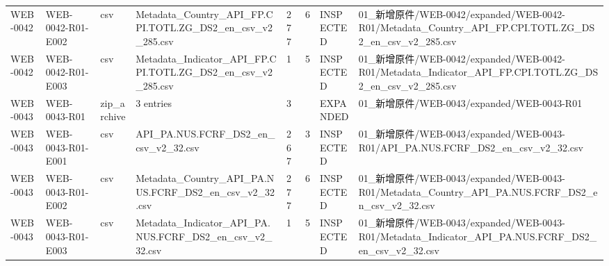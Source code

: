 \begin{landscape}
\begin{longtable}{p{1.8cm}p{2.2cm}p{3.1cm}p{4.7cm}p{1.3cm}p{1.3cm}p{3.0cm}p{5.3cm}}
WEB-0042 & WEB-0042-R01-E002 & csv & Metadata\_\allowbreak{}Country\_\allowbreak{}API\_\allowbreak{}FP.CPI.TOTL.ZG\_\allowbreak{}DS2\_\allowbreak{}en\_\allowbreak{}csv\_\allowbreak{}v2\_\allowbreak{}285.csv & 277 & 6 & INSPECTED & 01\_\allowbreak{}新增原件/\allowbreak{}WEB-0042/\allowbreak{}expanded/\allowbreak{}WEB-0042-R01/\allowbreak{}Metadata\_\allowbreak{}Country\_\allowbreak{}API\_\allowbreak{}FP.CPI.TOTL.ZG\_\allowbreak{}DS2\_\allowbreak{}en\_\allowbreak{}csv\_\allowbreak{}v2\_\allowbreak{}285.csv\\
WEB-0042 & WEB-0042-R01-E003 & csv & Metadata\_\allowbreak{}Indicator\_\allowbreak{}API\_\allowbreak{}FP.CPI.TOTL.ZG\_\allowbreak{}DS2\_\allowbreak{}en\_\allowbreak{}csv\_\allowbreak{}v2\_\allowbreak{}285.csv & 1 & 5 & INSPECTED & 01\_\allowbreak{}新增原件/\allowbreak{}WEB-0042/\allowbreak{}expanded/\allowbreak{}WEB-0042-R01/\allowbreak{}Metadata\_\allowbreak{}Indicator\_\allowbreak{}API\_\allowbreak{}FP.CPI.TOTL.ZG\_\allowbreak{}DS2\_\allowbreak{}en\_\allowbreak{}csv\_\allowbreak{}v2\_\allowbreak{}285.csv\\
WEB-0043 & WEB-0043-R01 & zip\_\allowbreak{}archive & 3 entries & 3 &  & EXPANDED & 01\_\allowbreak{}新增原件/\allowbreak{}WEB-0043/\allowbreak{}expanded/\allowbreak{}WEB-0043-R01\\
WEB-0043 & WEB-0043-R01-E001 & csv & API\_\allowbreak{}PA.NUS.FCRF\_\allowbreak{}DS2\_\allowbreak{}en\_\allowbreak{}csv\_\allowbreak{}v2\_\allowbreak{}32.csv & 267 & 3 & INSPECTED & 01\_\allowbreak{}新增原件/\allowbreak{}WEB-0043/\allowbreak{}expanded/\allowbreak{}WEB-0043-R01/\allowbreak{}API\_\allowbreak{}PA.NUS.FCRF\_\allowbreak{}DS2\_\allowbreak{}en\_\allowbreak{}csv\_\allowbreak{}v2\_\allowbreak{}32.csv\\
WEB-0043 & WEB-0043-R01-E002 & csv & Metadata\_\allowbreak{}Country\_\allowbreak{}API\_\allowbreak{}PA.NUS.FCRF\_\allowbreak{}DS2\_\allowbreak{}en\_\allowbreak{}csv\_\allowbreak{}v2\_\allowbreak{}32.csv & 277 & 6 & INSPECTED & 01\_\allowbreak{}新增原件/\allowbreak{}WEB-0043/\allowbreak{}expanded/\allowbreak{}WEB-0043-R01/\allowbreak{}Metadata\_\allowbreak{}Country\_\allowbreak{}API\_\allowbreak{}PA.NUS.FCRF\_\allowbreak{}DS2\_\allowbreak{}en\_\allowbreak{}csv\_\allowbreak{}v2\_\allowbreak{}32.csv\\
WEB-0043 & WEB-0043-R01-E003 & csv & Metadata\_\allowbreak{}Indicator\_\allowbreak{}API\_\allowbreak{}PA.NUS.FCRF\_\allowbreak{}DS2\_\allowbreak{}en\_\allowbreak{}csv\_\allowbreak{}v2\_\allowbreak{}32.csv & 1 & 5 & INSPECTED & 01\_\allowbreak{}新增原件/\allowbreak{}WEB-0043/\allowbreak{}expanded/\allowbreak{}WEB-0043-R01/\allowbreak{}Metadata\_\allowbreak{}Indicator\_\allowbreak{}API\_\allowbreak{}PA.NUS.FCRF\_\allowbreak{}DS2\_\allowbreak{}en\_\allowbreak{}csv\_\allowbreak{}v2\_\allowbreak{}32.csv\\

\end{longtable}
\end{landscape}

